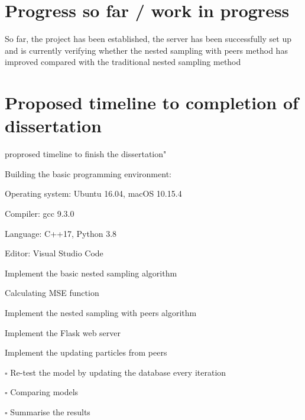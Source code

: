 \documentclass{article}
\begin{document}
\section{ Progress so far / work in progress}
So far, the project has been established, 
the server has been successfully set up and 
is currently verifying whether the nested sampling with peers method has improved compared with the traditional nested sampling method
\section{ Proposed timeline to completion of dissertation}
\begin{itemize}
    \item proprosed timeline to finish the dissertation"
  
    \begin{todolist}
      \item Building the basic programming environment:
      \begin{todolist}
        \item Operating system: Ubuntu 16.04, macOS 10.15.4
        \item Compiler: gcc 9.3.0
        \item Language: C++17, Python 3.8
        \item Editor: Visual Studio Code
      \end{todolist}
      \item Implement the basic nested sampling algorithm
      \item Calculating MSE function
      \item Implement the nested sampling with peers algorithm
      \begin{todolist}
        \item Implement the Flask web server
        \item Implement the updating particles from peers
      \end{todolist}
      \item[$\square$] Re-test the model by updating the database every iteration
      \item[$\square$] Comparing models
      \item[$\square$] Summarise the results
    \end{todolist}


  
  \end{itemize}
\end{document}
